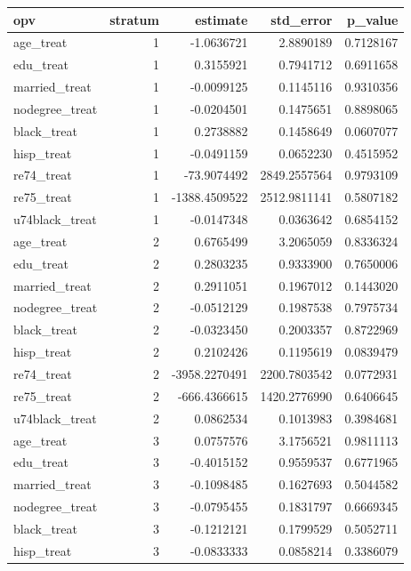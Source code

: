 \documentclass[
]{article}
\begin{document}
\begin{enumerate}
  \begin{longtable}[]{@{}lrrrr@{}}
  \toprule\noalign{}
  opv & stratum & estimate & std\_error & p\_value \\
  \midrule\noalign{}
  \endhead
  \bottomrule\noalign{}
  \endlastfoot
  age\_treat & 1 & -1.0636721 & 2.8890189 & 0.7128167 \\
  edu\_treat & 1 & 0.3155921 & 0.7941712 & 0.6911658 \\
  married\_treat & 1 & -0.0099125 & 0.1145116 & 0.9310356 \\
  nodegree\_treat & 1 & -0.0204501 & 0.1475651 & 0.8898065 \\
  black\_treat & 1 & 0.2738882 & 0.1458649 & 0.0607077 \\
  hisp\_treat & 1 & -0.0491159 & 0.0652230 & 0.4515952 \\
  re74\_treat & 1 & -73.9074492 & 2849.2557564 & 0.9793109 \\
  re75\_treat & 1 & -1388.4509522 & 2512.9811141 & 0.5807182 \\
  u74black\_treat & 1 & -0.0147348 & 0.0363642 & 0.6854152 \\
  age\_treat & 2 & 0.6765499 & 3.2065059 & 0.8336324 \\
  edu\_treat & 2 & 0.2803235 & 0.9333900 & 0.7650006 \\
  married\_treat & 2 & 0.2911051 & 0.1967012 & 0.1443020 \\
  nodegree\_treat & 2 & -0.0512129 & 0.1987538 & 0.7975734 \\
  black\_treat & 2 & -0.0323450 & 0.2003357 & 0.8722969 \\
  hisp\_treat & 2 & 0.2102426 & 0.1195619 & 0.0839479 \\
  re74\_treat & 2 & -3958.2270491 & 2200.7803542 & 0.0772931 \\
  re75\_treat & 2 & -666.4366615 & 1420.2776990 & 0.6406645 \\
  u74black\_treat & 2 & 0.0862534 & 0.1013983 & 0.3984681 \\
  age\_treat & 3 & 0.0757576 & 3.1756521 & 0.9811113 \\
  edu\_treat & 3 & -0.4015152 & 0.9559537 & 0.6771965 \\
  married\_treat & 3 & -0.1098485 & 0.1627693 & 0.5044582 \\
  nodegree\_treat & 3 & -0.0795455 & 0.1831797 & 0.6669345 \\
  black\_treat & 3 & -0.1212121 & 0.1799529 & 0.5052711 \\
  hisp\_treat & 3 & -0.0833333 & 0.0858214 & 0.3386079 \\

\end{longtable}
\end{enumerate}
\end{document}
